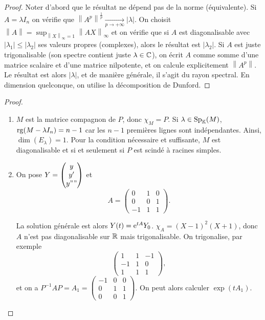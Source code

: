 \documentclass[12pt]{article}
\begin{document}
\begin{proof}
	Noter d'abord que le résultat ne dépend pas de la norme (équivalente).
	Si $A=\lambda I_n$ on vérifie que $\left\lVert A^{p}\right\rVert^{\frac{1}{p}}\xrightarrow[p\to+\infty]{}\left\lvert\lambda\right\rvert$. On choisit $\left\lVert A\right\rVert=\sup_{\left\lVert X\right\rVert_{\infty}=1}\left\lVert AX\right\rVert_{\infty}$ et on vérifie que si $A$ est diagonalisable avec $\left\lvert \lambda_{1}\right\rvert\leqslant\left\lvert\lambda_{2}\right\rvert$ ses valeurs propres (complexes), alors le résultat est $\left\lvert \lambda_{2}\right\rvert$. Si $A$ est juste trigonalisable (son spectre contient juste $\lambda\in\mathbb{C}$), on écrit $A$ comme somme d'une matrice scalaire et d'une matrice nilpotente, et on calcule explicitement $\left\lVert A^p\right\rVert$. Le résultat est alors $\left\lvert\lambda\right\rvert$, et de manière générale, il s'agit du rayon spectral. En dimension quelconque, on utilise la décomposition de Dunford.
\end{proof}

\begin{proof}\phantom{}
	\begin{enumerate}
		\item $M$ est la matrice compagnon de $P$, donc $\chi_{M}=P$. Si $\lambda\in\operatorname{Sp}_{\mathbb{K}}(M)$, $\operatorname{rg}(M-\lambda I_n)=n-1$ car les $n-1$ premières lignes sont indépendantes. Ainsi, $\dim(E_{\lambda})=1$. Pour la condition nécessaire et suffisante, $M$ est diagonalisable et si et seulement si $P$ est scindé à racines simples.
		\item On pose $Y=\begin{pmatrix}
			y\\y'\\y""
		\end{pmatrix}$ et 
		\begin{equation*}
			A=\begin{pmatrix}
				0&1&0\\
				0&0&1\\
				-1&1&1
			\end{pmatrix}.
		\end{equation*}

		La solution générale est alors $Y(t)=\mathrm{e}^{t A}Y_{0}$. $\chi_{A}=(X-1)^{2}(X+1)$, donc $A$ n'est pas diagonalisable sur $\mathbb{R}$ mais trigonalisable. On trigonalise, par exemple
		\begin{equation*}
			\begin{pmatrix}
				1&1&-1\\-1&1&0\\1&1&1
			\end{pmatrix},
		\end{equation*}
		et on a $P^{-1}AP=A_1=\begin{pmatrix}
			-1&0&0\\0&1&1\\0&0&1
		\end{pmatrix}$. On peut alors calculer $\exp(tA_{1})$.
	\end{enumerate}
\end{proof}
\end{document}
